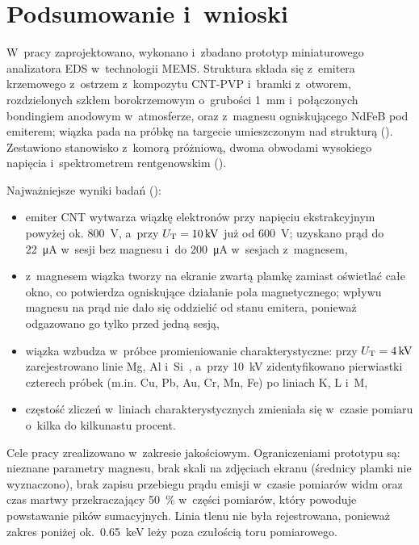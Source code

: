 \chapter{Podsumowanie i~wnioski}
\label{ch:podsumowanie}

W~pracy zaprojektowano, wykonano i~zbadano prototyp miniaturowego
analizatora EDS w~technologii MEMS. Struktura składa się z~emitera
krzemowego z~ostrzem z~kompozytu CNT-PVP i~bramki z~otworem,
rozdzielonych szkłem borokrzemowym o~grubości \SI{1}{\milli\metre}
i~połączonych bondingiem anodowym w~atmosferze, oraz z~magnesu
ogniskującego NdFeB pod emiterem; wiązka pada na próbkę na targecie
umieszczonym nad strukturą ().
Zestawiono stanowisko z~komorą próżniową, dwoma obwodami wysokiego
napięcia i~spektrometrem rentgenowskim ().

Najważniejsze wyniki badań ():
\begin{itemize}
  \item emiter CNT wytwarza wiązkę elektronów przy napięciu ekstrakcyjnym
        powyżej ok. \SI{800}{\volt}, a~przy $U_\mathrm{T} = \SI{10}{\kilo\volt}$
        już od \SI{600}{\volt}; uzyskano prąd do \SI{22}{\micro\ampere}
        w~sesji bez magnesu i~do \SI{200}{\micro\ampere} w~sesjach
        z~magnesem,
  \item z~magnesem wiązka tworzy na ekranie zwartą plamkę zamiast oświetlać
        całe okno, co potwierdza ogniskujące działanie pola magnetycznego;
        wpływu magnesu na prąd nie dało się oddzielić od stanu emitera,
        ponieważ odgazowano go tylko przed jedną sesją,
  \item wiązka wzbudza w~próbce promieniowanie charakterystyczne: przy
        $U_\mathrm{T} = \SI{4}{\kilo\volt}$ zarejestrowano linie Mg, Al i~Si~\Ka,
        a~przy \SI{10}{\kilo\volt} zidentyfikowano pierwiastki czterech
        próbek (m.in. Cu, Pb, Au, Cr, Mn, Fe) po liniach K, L i~M,
  \item częstość zliczeń w~liniach charakterystycznych zmieniała się
        w~czasie pomiaru o~kilka do kilkunastu procent.
\end{itemize}

Cele pracy zrealizowano w~zakresie jakościowym. Ograniczeniami
prototypu są:  nieznane parametry magnesu, brak
skali na zdjęciach ekranu (średnicy plamki nie wyznaczono), brak
zapisu przebiegu prądu emisji w~czasie pomiarów widm oraz czas martwy
przekraczający \SI{50}{\percent} w~części pomiarów, który powoduje
powstawanie pików sumacyjnych. Linia tlenu nie była rejestrowana,
ponieważ zakres poniżej ok.~\SI{0.65}{\kilo\electronvolt} leży poza
czułością toru pomiarowego.

